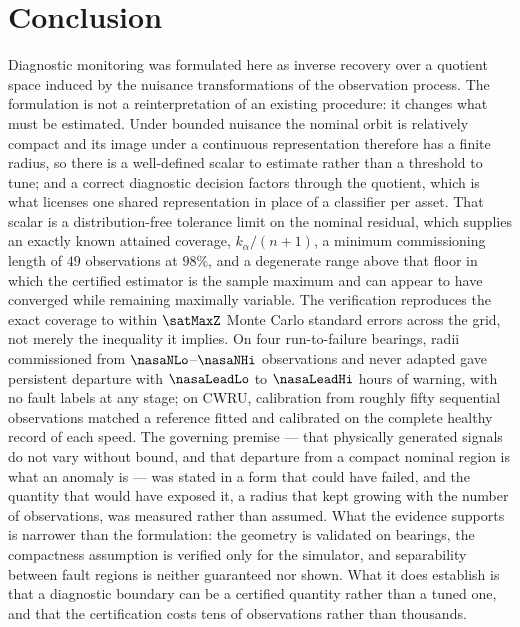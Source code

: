 \documentclass[a4paper]{cas-sc}
\begin{document}
\section{Conclusion}
\label{sec:conclusion}

Diagnostic monitoring was formulated here as inverse recovery over a quotient
space induced by the nuisance transformations of the observation process. The
formulation is not a reinterpretation of an existing procedure: it changes
what must be estimated. Under bounded nuisance the nominal orbit is relatively
compact and its image under a continuous representation therefore has a finite
radius, so there is a well-defined scalar to estimate rather than a threshold
to tune; and a correct diagnostic decision factors through the quotient, which
is what licenses one shared representation in place of a classifier per asset.
That scalar is a distribution-free tolerance limit on the nominal residual,
which supplies an exactly known attained coverage,
\(k_\alpha/(n+1)\), a minimum commissioning length of \(49\) observations at
\(98\%\), and a degenerate range above that floor in which the certified
estimator is the sample maximum and can appear to have converged while
remaining maximally variable. The verification reproduces the exact coverage
to within \(\satMaxZ\) Monte Carlo standard errors across the grid, not
merely the inequality it implies. On four run-to-failure bearings, radii
commissioned from \(\nasaNLo\)--\(\nasaNHi\) observations and never
adapted gave persistent departure with \(\nasaLeadLo\) to \(\nasaLeadHi\)
hours of warning, with no fault labels at any stage; on CWRU, calibration from
roughly fifty sequential observations matched a reference fitted and
calibrated on the complete healthy record of each speed. The governing premise
--- that physically generated signals do not vary without bound, and that
departure from a compact nominal region is what an anomaly is --- was stated in
a form that could have failed, and the quantity that would have exposed it,
a radius that kept growing with the number of observations, was measured
rather than assumed. What the evidence supports is narrower than the
formulation: the geometry is validated on bearings, the compactness assumption
is verified only for the simulator, and separability between fault regions is
neither guaranteed nor shown. What it does establish is that a diagnostic
boundary can be a certified quantity rather than a tuned one, and that the
certification costs tens of observations rather than thousands.
\end{document}
